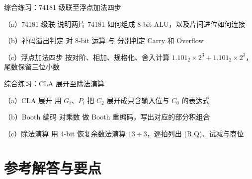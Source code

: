\begin{chapterexercise}{综合练习：74181 级联至浮点加法四步}
\begin{exercisesubproblem}{（a）74181 级联}
说明两片 74181 如何组成 8-bit ALU，以及片间进位如何连接
\end{exercisesubproblem}
\begin{exercisesubproblem}{（b）补码溢出判定}
对 8-bit 运算  与  分别判定 Carry 和 Overflow
\end{exercisesubproblem}
\begin{exercisesubproblem}{（c）浮点加法四步}
按对阶、相加、规格化、舍入计算 $1.101_2\times2^3+1.101_2\times2^3$，尾数保留三位小数
\end{exercisesubproblem}
\end{chapterexercise}

\begin{chapterexercise}{综合练习：CLA 展开至除法演算}
\begin{exercisesubproblem}{（a）CLA 展开}
用 $G_i$、$P_i$ 把 $C_2$ 展开成只含输入位与 $C_0$ 的表达式
\end{exercisesubproblem}
\begin{exercisesubproblem}{（b）Booth 编码}
对乘数  做 Booth 重编码，写出对应的部分积组合
\end{exercisesubproblem}
\begin{exercisesubproblem}{（c）除法演算}
用 4-bit 恢复余数法演算 $13\div3$，逐拍列出 (R,Q)、试减与商位
\end{exercisesubproblem}
\end{chapterexercise}

\section*{参考解答与要点}

